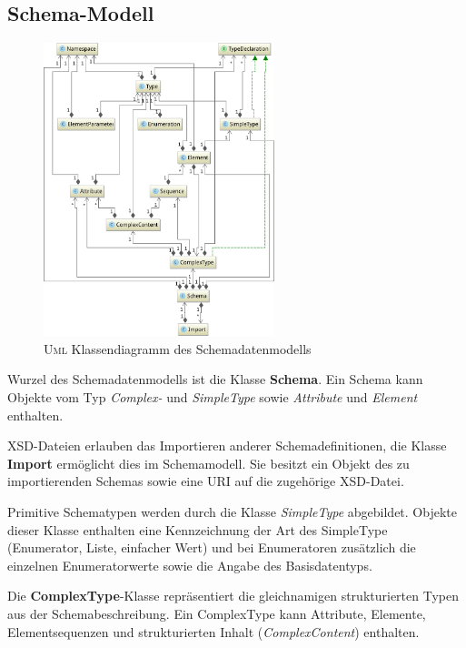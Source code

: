 \subsection{Schema-Modell}
\label{sec:schema_model}

\begin{figure}[t]
    \centering
    \includegraphics[width=0.6\textwidth]{resources/typemodel}
    \caption{\textsc{Uml} Klassendiagramm des Schemadatenmodells}
    \label{fig:schema_model}
\end{figure}

Wurzel des Schemadatenmodells ist die Klasse \textbf{Schema}. Ein Schema kann Objekte vom Typ \emph{Complex-} und \emph{SimpleType} sowie \emph{Attribute} und \emph{Element} enthalten.

\gls{XSD}-Dateien erlauben das Importieren anderer Schemadefinitionen, die Klasse \textbf{Import} ermöglicht dies im Schemamodell. Sie besitzt ein Objekt des zu importierenden Schemas sowie eine \gls{URI} auf die zugehörige \gls{XSD}-Datei.

Primitive Schematypen werden durch die Klasse \emph{SimpleType} abgebildet. Objekte dieser Klasse enthalten eine Kennzeichnung der Art des SimpleType (Enumerator, Liste, einfacher Wert) und bei Enumeratoren zusätzlich die einzelnen Enumeratorwerte sowie die Angabe des Basisdatentyps.

Die \textbf{ComplexType}-Klasse repräsentiert die gleichnamigen strukturierten Typen aus der Schemabeschreibung. 
Ein ComplexType kann Attribute, Elemente, Elementsequenzen und strukturierten Inhalt (\emph{ComplexContent}) enthalten.

